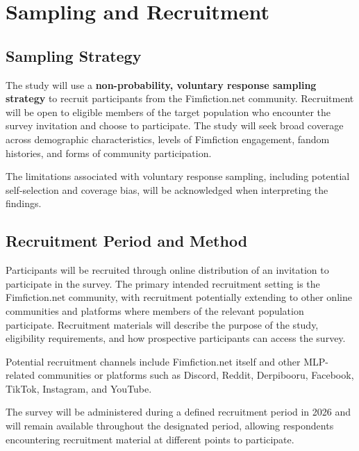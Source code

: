 \section{Sampling and Recruitment}

\subsection{Sampling Strategy}

The study will use a \textbf{non-probability, voluntary response sampling strategy} to recruit participants from the Fimfiction.net community. Recruitment will be open to eligible members of the target population who encounter the survey invitation and choose to participate. The study will seek broad coverage across demographic characteristics, levels of Fimfiction engagement, fandom histories, and forms of community participation.

The limitations associated with voluntary response sampling, including potential self-selection and coverage bias, will be acknowledged when interpreting the findings.


\subsection{Recruitment Period and Method}


Participants will be recruited through online distribution of an invitation to participate in the survey. The primary intended recruitment setting is the Fimfiction.net community, with recruitment potentially extending to other online communities and platforms where members of the relevant population participate. Recruitment materials will describe the purpose of the study, eligibility requirements, and how prospective participants can access the survey.

Potential recruitment channels include Fimfiction.net itself and other MLP-related communities or platforms such as Discord, Reddit, Derpibooru, Facebook, TikTok, Instagram, and YouTube.

The survey will be administered during a defined recruitment period in 2026 and will remain available throughout the designated period, allowing respondents encountering recruitment material at different points to participate.

